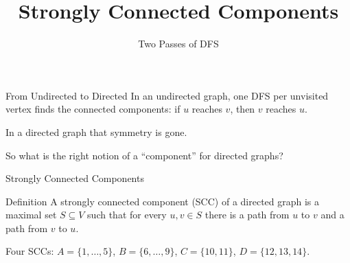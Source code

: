 \documentclass[10pt,aspectratio=169]{beamer}
\title{Strongly Connected Components}
\subtitle{Two Passes of DFS}
\date{}
\author{}
\newcommand{\sccgraph}[2]{%
  \foreach \i/\x/\y/\g in {1/0/1.3/A, 2/1.2/0.8/A, 3/1.2/-0.8/A, 4/0/-1.3/A,
      5/-1.2/0/A, 6/3.0/1.0/B, 7/5.0/1.5/B, 8/5.0/-1.5/B, 9/3.0/-1.0/B,
      10/7.6/0.7/C, 11/7.6/-0.7/C, 12/10.2/0/D, 13/11.0/0.9/D, 14/11.0/-0.9/D}
    \node[vtx, g\g, v\i/.try] (v\i) at (\x,\y) {\i};
  \foreach \a/\b/\o/\t in {1/2/0/1, 2/3/0/1, 3/4/0/1, 4/2/0/0, 4/5/0/1,
      5/1/0/0, 6/7/0/1, 7/8/0/1, 8/6/0/0, 8/9/0/1, 9/6/0/0, 10/11/25/1,
      11/10/25/0, 12/13/25/0, 13/14/25/1, 14/12/25/1, 5/6/-20/1, 9/10/0/1,
      11/13/-20/1, 2/9/0/0, 7/12/30/0} {
    \ifnum#2=1 \ifnum\t=1 \def\es{tree}\else\def\es{}\fi \else\def\es{}\fi
    \ifnum#1=0
      \draw[dedg, \es] (v\a) to[bend left=\o] (v\b);
    \else
      \draw[dedg] (v\b) to[bend right=\o] (v\a);
    \fi
  }
}
\newcommand{\sccboxes}{%
  \draw[sccbox] (-1.75,-1.85) rectangle (1.75,1.85);
  \draw[sccbox] (2.45,-2.05) rectangle (5.55,2.05);
  \draw[sccbox] (7.0,-1.3) rectangle (8.2,1.3);
  \draw[sccbox] (9.6,-1.5) rectangle (11.6,1.5);
  \node[scclbl] at (0,2.15) {$A$};
  \node[scclbl] at (4.0,2.35) {$B$};
  \node[scclbl] at (7.6,-1.6) {$C$};
  \node[scclbl] at (10.6,1.8) {$D$};
}
\begin{document}
\maketitle

\begin{frame}{From Undirected to Directed}
  In an \alert{undirected} graph, one DFS per unvisited vertex finds the
  connected components: if $u$ reaches $v$, then $v$ reaches $u$.

  \pause
  \bigskip
  In a \alert{directed} graph that symmetry is gone.

  \bigskip
  \begin{center}
  \end{center}

  \pause
  \bigskip
  \begin{center}
    So what is the right notion of a ``component'' for directed graphs?
  \end{center}
\end{frame}

\begin{frame}{Strongly Connected Components}
  \begin{block}{Definition}
    A \alert{strongly connected component (SCC)} of a directed graph is a
    maximal set $S \subseteq V$ such that for every $u, v \in S$ there is a
    path from $u$ to $v$ \alert{and} a path from $v$ to $u$.
  \end{block}

  \begin{center}
  \end{center}

  \begin{center}
    \small Four SCCs: $A = \{1,\ldots,5\}$, $B = \{6,\ldots,9\}$,
    $C = \{10, 11\}$, $D = \{12, 13, 14\}$.
  \end{center}
\end{frame}

\end{document}
